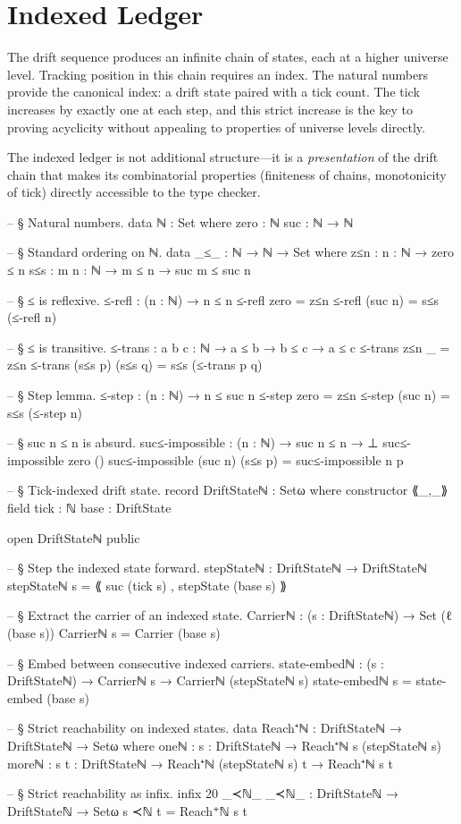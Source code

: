\documentclass[11pt,a4paper]{book}
\begin{document}
\chapter{Indexed Ledger}

The drift sequence produces an infinite chain of states, each at a higher universe level. Tracking position in this chain requires an index. The natural numbers provide the canonical index: a drift state paired with a tick count. The tick increases by exactly one at each step, and this strict increase is the key to proving acyclicity without appealing to properties of universe levels directly.

The indexed ledger is not additional structure—it is a \textit{presentation} of the drift chain that makes its combinatorial properties (finiteness of chains, monotonicity of tick) directly accessible to the type checker.

\begin{code}
-- § Natural numbers.
data ℕ : Set where
  zero : ℕ
  suc  : ℕ → ℕ

-- § Standard ordering on ℕ.
data _≤_ : ℕ → ℕ → Set where
  z≤n : {n : ℕ} → zero ≤ n
  s≤s : {m n : ℕ} → m ≤ n → suc m ≤ suc n

-- § ≤ is reflexive.
≤-refl : (n : ℕ) → n ≤ n
≤-refl zero    = z≤n
≤-refl (suc n) = s≤s (≤-refl n)

-- § ≤ is transitive.
≤-trans : {a b c : ℕ} → a ≤ b → b ≤ c → a ≤ c
≤-trans z≤n       _          = z≤n
≤-trans (s≤s p) (s≤s q) = s≤s (≤-trans p q)

-- § Step lemma.
≤-step : (n : ℕ) → n ≤ suc n
≤-step zero    = z≤n
≤-step (suc n) = s≤s (≤-step n)

-- § suc n ≤ n is absurd.
suc≤-impossible : (n : ℕ) → suc n ≤ n → ⊥
suc≤-impossible zero ()
suc≤-impossible (suc n) (s≤s p) = suc≤-impossible n p

-- § Tick-indexed drift state.
record DriftStateℕ : Setω where
  constructor ⟪_,_⟫
  field
    tick : ℕ
    base : DriftState

open DriftStateℕ public

-- § Step the indexed state forward.
stepStateℕ : DriftStateℕ → DriftStateℕ
stepStateℕ s = ⟪ suc (tick s) , stepState (base s) ⟫

-- § Extract the carrier of an indexed state.
Carrierℕ : (s : DriftStateℕ) → Set (ℓ (base s))
Carrierℕ s = Carrier (base s)

-- § Embed between consecutive indexed carriers.
state-embedℕ : (s : DriftStateℕ) → Carrierℕ s → Carrierℕ (stepStateℕ s)
state-embedℕ s = state-embed (base s)

-- § Strict reachability on indexed states.
data Reach⁺ℕ : DriftStateℕ → DriftStateℕ → Setω where
  oneℕ  : {s : DriftStateℕ} → Reach⁺ℕ s (stepStateℕ s)
  moreℕ : {s t : DriftStateℕ} → Reach⁺ℕ (stepStateℕ s) t → Reach⁺ℕ s t

-- § Strict reachability as infix.
infix 20 _≺ℕ_
_≺ℕ_ : DriftStateℕ → DriftStateℕ → Setω
s ≺ℕ t = Reach⁺ℕ s t
\end{code}
\end{document}
